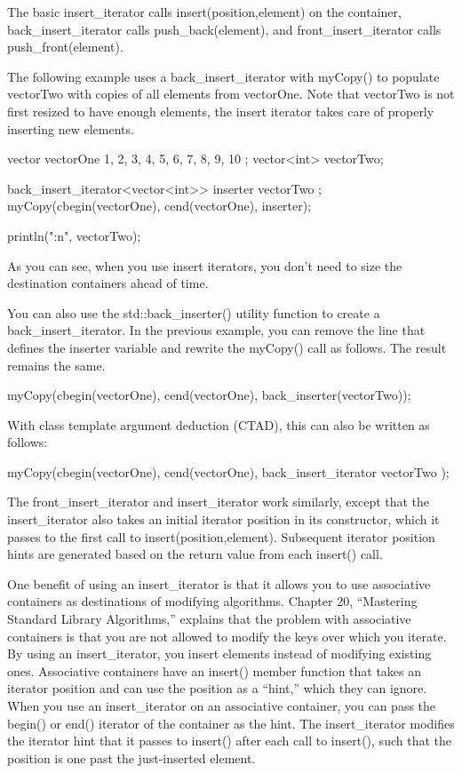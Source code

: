 The basic insert\_iterator calls insert(position,element) on the container, back\_insert\_iterator calls push\_back(element), and front\_insert\_iterator calls push\_front(element).

The following example uses a back\_insert\_iterator with myCopy() to populate vectorTwo with copies of all elements from vectorOne. Note that vectorTwo is not first resized to have enough elements, the insert iterator takes care of properly inserting new elements.

\begin{cpp}
vector vectorOne { 1, 2, 3, 4, 5, 6, 7, 8, 9, 10 };
vector<int> vectorTwo;

back_insert_iterator<vector<int>> inserter { vectorTwo };
myCopy(cbegin(vectorOne), cend(vectorOne), inserter);

println("{:n}", vectorTwo);
\end{cpp}

As you can see, when you use insert iterators, you don’t need to size the destination containers ahead of time.

You can also use the std::back\_inserter() utility function to create a back\_insert\_iterator. In the previous example, you can remove the line that defines the inserter variable and rewrite the myCopy() call as follows. The result remains the same.

\begin{cpp}
myCopy(cbegin(vectorOne), cend(vectorOne), back_inserter(vectorTwo));
\end{cpp}

With class template argument deduction (CTAD), this can also be written as follows:

\begin{cpp}
myCopy(cbegin(vectorOne), cend(vectorOne), back_insert_iterator { vectorTwo });
\end{cpp}

The front\_insert\_iterator and insert\_iterator work similarly, except that the insert\_iterator also takes an initial iterator position in its constructor, which it passes to the first call to insert(position,element). Subsequent iterator position hints are generated based on the return value from each insert() call.

One benefit of using an insert\_iterator is that it allows you to use associative containers as destinations of modifying algorithms. Chapter 20, “Mastering Standard Library Algorithms,” explains that the problem with associative containers is that you are not allowed to modify the keys over which you iterate. By using an insert\_iterator, you insert elements instead of modifying existing ones. Associative containers have an insert() member function that takes an iterator position and can use the position as a “hint,” which they can ignore. When you use an insert\_iterator on an associative container, you can pass the begin() or end() iterator of the container as the hint. The insert\_iterator modifies the iterator hint that it passes to insert() after each call to insert(), such that the position is one past the just-inserted element.

